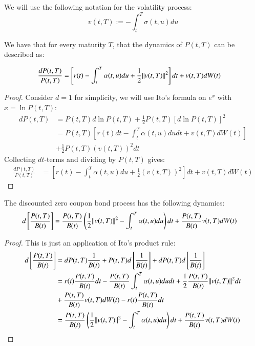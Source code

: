 \begin{notation}
We will use the following notation for the volatility process:
\[
v(t,T) := -\int_{t}^{T}\sigma(t,u)du
\]
\end{notation}

\begin{lemma} 
We have that for every maturity $T$, that the dynamics of $P(t,T)$
can be described as:

\begin{align*}
\frac{dP(t,T)}{P(t,T)}
&= \left[
r(t) - \int_{t}^{T}\alpha(t,u)du + \frac{1}{2}
\norm{v(t,T)}^{2}
\right]dt 
+ v(t,T)dW(t)
\end{align*}
\end{lemma} 

\begin{proof}
Consider $d=1$ for simplicity,
we will use Ito's formula on $e^{x}$ with $x = \ln{P(t,T)}$: 
\begin{align*}
dP(t,T) &= P(t,T)d\ln{P(t,T)} + \frac{1}{2}P(t,T)[d\ln{P(t,T)}]^{2} \\ 
&= P(t,T)\left[
r(t)dt -\int_{t}^{T}\alpha(t,u)dudt 
+ v(t,T)dW(t)
\right] \\ 
&+ \frac{1}{2}P(t,T)\left(
v(t,T)
\right)^{2}dt
\end{align*} 
Collecting $dt$-terms and dividing by $P(t,T)$ gives: 
\begin{align*}
\frac{dP(t,T)}{P(t,T)} &= 
\left[
r(t) - \int_{t}^{T}\alpha(t,u)du + \frac{1}{2}\left(
v(t,T) \right)^{2}
\right]dt 
+ v(t,T)dW(t)
\end{align*}

\end{proof}

\begin{corollary}
The discounted zero coupon bond process has the following dynamics: 
\begin{align}
\label{eq: discounted_ZCB_dynamics_P}
d\left[
\frac{P(t,T)}{B(t)}
\right]
&= 
\frac{P(t,T)}{B(t)}\left(
\frac{1}{2}\norm{v(t,T)}^{2} - \int_{t}^{T}\alpha(t,u)du
\right)dt 
+ 
\frac{P(t,T)}{B(t)}v(t,T)dW(t)
\end{align}
\end{corollary}

\begin{proof}
This is just an application of Ito's product rule:
\begin{align*}
d\left[
\frac{P(t,T)}{B(t)}
\right] 
&= 
dP(t,T)\frac{1}{B(t)} + P(t,T)d\left[\frac{1}{B(t)}\right] +dP(t,T)d\left[\frac{1}{B(t)}\right] \\ 
&= 
r(t)\frac{P(t,T)}{B(t)}dt - \frac{P(t,T)}{B(t)}\int_{t}^{T}\alpha(t,u)dudt 
+\frac{1}{2}\frac{P(t,T)}{B(t)}\norm{v(t,T)}^{2}dt \\
&+\frac{P(t,T)}{B(t)}v(t,T)dW(t) - r(t)\frac{P(t,T)}{B(t)}dt \\ 
&= 
\frac{P(t,T)}{B(t)}\left(
\frac{1}{2}\norm{v(t,T)}^{2} - \int_{t}^{T}\alpha(t,u)du
\right)dt 
+ 
\frac{P(t,T)}{B(t)}v(t,T)dW(t)
\end{align*}
\end{proof}

